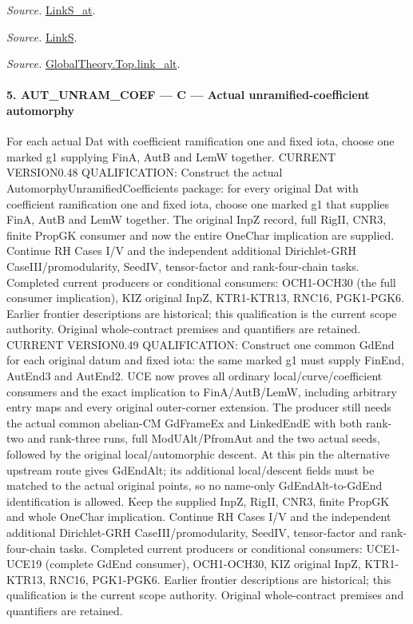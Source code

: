 \emph{Source.} \href{https://github.com/CocoSgt/riemann-hypothesis-lean/blob/7cbf7a0c32fca1badf05931879a37c3f8a2b03b4/src/Formalism/SharpRestriction/GlobalTheoremInputs.lean#L145-L149}{LinkS\_\allowbreak at}.

\emph{Source.} \href{https://github.com/CocoSgt/riemann-hypothesis-lean/blob/7cbf7a0c32fca1badf05931879a37c3f8a2b03b4/src/Formalism/SharpRestriction/GlobalTheoremInputs.lean#L152-L157}{LinkS}.

\emph{Source.} \href{https://github.com/CocoSgt/riemann-hypothesis-lean/blob/7cbf7a0c32fca1badf05931879a37c3f8a2b03b4/src/Development/AbelianVarietyTheory/Proofs/GlobalInterpolation/LinkAlt.lean#L16-L50}{GlobalTheory.Top.link\_\allowbreak alt}.



\paragraph{5. AUT\_\allowbreak UNRAM\_\allowbreak COEF — C — Actual unramified-coefficient automorphy}

For each actual Dat with coefficient ramification one and fixed iota, choose one marked g1 supplying FinA, AutB and LemW together. CURRENT VERSION0.48 QUALIFICATION: Construct the actual AutomorphyUnramifiedCoefficients package: for every original Dat with coefficient ramification one and fixed iota, choose one marked g1 that supplies FinA, AutB and LemW together. The original InpZ record, full RigII, CNR3, finite PropGK consumer and now the entire OneChar implication are supplied. Continue RH Cases I/V and the independent additional Dirichlet-GRH CaseIII/promodularity, SeedIV, tensor-factor and rank-four-chain tasks. Completed current producers or conditional consumers: OCH1-OCH30 (the full consumer implication), KIZ original InpZ, KTR1-KTR13, RNC16, PGK1-PGK6. Earlier frontier descriptions are historical; this qualification is the current scope authority. Original whole-contract premises and quantifiers are retained. CURRENT VERSION0.49 QUALIFICATION: Construct one common GdEnd for each original datum and fixed iota: the same marked g1 must supply FinEnd, AutEnd3 and AutEnd2. UCE now proves all ordinary local/curve/coefficient consumers and the exact implication to FinA/AutB/LemW, including arbitrary entry maps and every original outer-corner extension. The producer still needs the actual common abelian-CM GdFrameEx and LinkedEndE with both rank-two and rank-three runs, full ModUAlt/PfromAut and the two actual seeds, followed by the original local/automorphic descent. At this pin the alternative upstream route gives GdEndAlt; its additional local/descent fields must be matched to the actual original points, so no name-only GdEndAlt-to-GdEnd identification is allowed. Keep the supplied InpZ, RigII, CNR3, finite PropGK and whole OneChar implication. Continue RH Cases I/V and the independent additional Dirichlet-GRH CaseIII/promodularity, SeedIV, tensor-factor and rank-four-chain tasks. Completed current producers or conditional consumers: UCE1-UCE19 (complete GdEnd consumer), OCH1-OCH30, KIZ original InpZ, KTR1-KTR13, RNC16, PGK1-PGK6. Earlier frontier descriptions are historical; this qualification is the current scope authority. Original whole-contract premises and quantifiers are retained.

